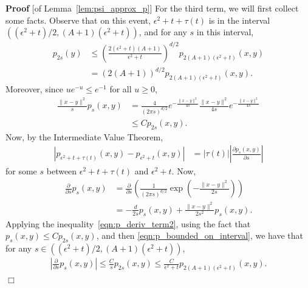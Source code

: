 \documentclass[12pt]{article}
\newenvironment {proof}{{\noindent\bf Proof }}{\hfill $\Box$ \medskip}
\begin{document}
\begin{proof}[of Lemma~\ref{lem:psi_approx_p}]
    For the third term, we will first collect some facts.
    Observe that on this event,
    $\epsilon^2 + t + \tau(t)$ is in the interval
    $((\epsilon^2 + t)/ 2, (A + 1)(\epsilon^2 + t))$,
    and for any $s$ in this interval,
    \begin{align}
        p_{2s}(y)
        &\le \nonumber
        \left( \frac{
            2 (\epsilon^2 + t)(A + 1)
        }{
            \epsilon^2 + t
        } \right)^{d/2}
        p_{2(A+1)(\epsilon^2 + t)}(x, y)
        \\ &= \label{eqn:p_bounded_on_interval}
        (2(A+1))^{d/2}
        p_{2(A+1)(\epsilon^2 + t)}(x, y) .
    \end{align}
    Moreover, since $u e^{-u} \le e^{-1}$ for all $u \ge 0$,
    \begin{align}
        \frac{\|x - y\|^2}{s} p_s(x, y)
        &= \nonumber
        \frac{4}{(2 \pi s)^{d/2}}
        e^{- \frac{ \|x-y\|^2 }{ 4s }}
        \frac{\|x-y\|^2}{4s}
        e^{- \frac{ \|x-y\|^2 }{ 4s }}
        \\ &\le \label{eqn:p_deriv_term2}
        C p_{2s}(x, y) .
    \end{align}
    Now, by the Intermediate Value Theorem,
    \begin{align*}
        \left|
            p_{\epsilon^2 + t + \tau(t)}(x, y)
            -
            p_{\epsilon^2 + t}(x, y)
        \right|
        &=
        \left| \tau(t) \right|
        \left| \frac{\partial p_s(x, y)}{\partial s} \right|
    \end{align*}
    for some $s$ between $\epsilon^2 + t + \tau(t)$ and $\epsilon^2 + t$.
    Now,
    \begin{align*}
        \frac{\partial}{\partial s} p_s(x, y)
        &=
        \frac{\partial}{\partial s}
        \left(
            \frac{1}{(2 \pi s)^{d/2}}
            \exp\left( - \frac{\|x - y\|^2}{2 s} \right)
        \right)
        \\ &=
        - \frac{d}{2s} p_s(x, y) + \frac{\|x - y\|^2}{2 s^2} p_s(x, y)  .
    \end{align*}
    Applying the inequality~\eqref{eqn:p_deriv_term2},
    using the fact that $p_s(x, y) \le C p_{2s}(x,y)$,
    and then \eqref{eqn:p_bounded_on_interval},
    we have that for any $s \in ((\epsilon^2 + t)/ 2, (A + 1)(\epsilon^2 + t))$,
    \begin{align*}
        \left| \frac{\partial}{\partial s} p_s(x, y) \right|
        \le
        \frac{C}{s} p_{2s}(x, y) 
        \le
        \frac{C}{\epsilon^2 + t} p_{2(A + 1)(\epsilon^2 + t)}(x, y) .

\end{align*}
\end{proof}
\end{document}
